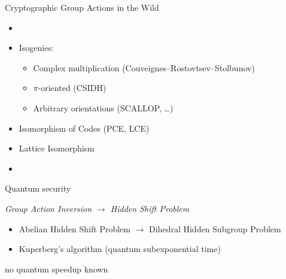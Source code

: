 \documentclass[aspectratio=169]{beamer}
\begin{document}
\begin{frame}{\alert<2->{Cryptographic} Group Actions in the Wild}
  \large
  \begin{description}[labelwidth=0]
    \setlength{\itemsep}{2em}
  \item[Abelian]
    \begin{itemize}
    \item {}
    \item Isogenies:
      \begin{itemize}
      \item Complex multiplication (Couveignes--Rostovtsev--Stolbunov)
      \item $\pi$-oriented (CSIDH)
      \item Arbitrary orientations (SCALLOP, \dots)
      \end{itemize}
    \end{itemize}
  \item[Non-Abelian]
    \begin{itemize}
    \item Isomorphism of Codes (PCE, LCE)
    \item Lattice Isomorphism
    \item {}
    \end{itemize}
  \end{description}
\end{frame}


\begin{frame}{Quantum security}
  \large
  \begin{center}
    \emph{Group Action Inversion $→$ Hidden Shift Problem}
  \end{center}

  \bigskip
  
  \begin{description}[labelwidth=0]
    \setlength{\itemsep}{2em}
  \item[Abelian:]
    \begin{itemize}
    \item Abelian Hidden Shift Problem $→$ Dihedral Hidden Subgroup
      Problem
    \item Kuperberg's algorithm (quantum subexponential time)
    \end{itemize}
  \item[Non-Abelian:]
    no quantum speedup known
  \end{description}
\end{frame}
\end{document}
